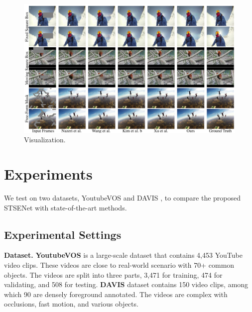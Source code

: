 \begin{figure}[t]
	\centering
	\includegraphics[width=2.0\columnwidth]{viszong} %
	\caption{Visualization.}
	\label{viszong}
\end{figure}


\section{Experiments}


We test on two datasets, YoutubeVOS \cite{xu2018youtube} and DAVIS \cite{davis_2017}, to compare the proposed STSENet with state-of-the-art methods. %
\subsection{Experimental Settings}
\textbf{Dataset.} 
\textbf{YoutubeVOS} is a large-scale dataset that contains 4,453 YouTube video clips. These videos are close to real-world scenario with 70+ common objects. 
The videos are split into three parts, 3,471 for training, 474 for validating, and 508 for testing. 
\textbf{DAVIS} dataset contains 150 video clips, among which 90 are densely foreground annotated. 
The videos are complex with occlusions, fast motion, and various objects. 

